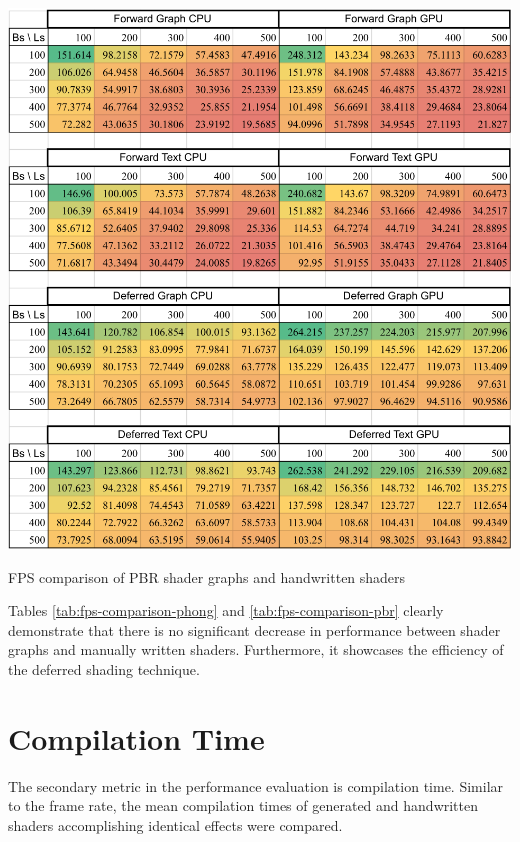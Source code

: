 \documentclass[
  digital,     %
  oneside,     %
  nosansbold,  %
  nocolorbold, %
  lof,         %
  lot,         %
]{fithesis4}
\begin{document}
\begin{table}[H]
    \centering
    \includegraphics[width=\textwidth]{FPS/MeasureFPS-PBR.png}
    \caption{FPS comparison of PBR shader graphs and handwritten shaders}
    \label{tab:fps-comparison-pbr}
\end{table}

Tables \ref{tab:fps-comparison-phong} and \ref{tab:fps-comparison-pbr} clearly demonstrate that there is no significant decrease
in performance between shader graphs and manually written shaders.
Furthermore, it showcases the efficiency of the deferred shading technique.

\section{Compilation Time}
The secondary metric in the performance evaluation is compilation time.
Similar to the frame rate, the mean compilation times of generated and handwritten shaders accomplishing identical effects
were compared.
\end{document}
